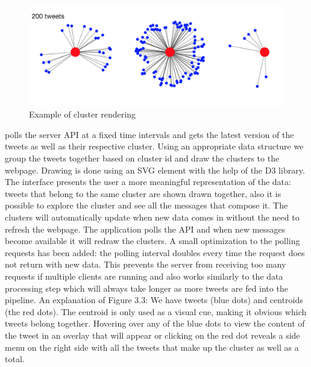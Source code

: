 \begin{figure}[ht!]
\centering
\includegraphics[width=\textwidth,height=\textheight,keepaspectratio]{src/img/clusters.png}
\caption{Example of cluster rendering\label{overflow}}
\end{figure}

{\frontend}  polls the server API at a fixed time intervals and gets the latest version of the tweets as well as their respective cluster. Using an appropriate data structure we group the tweets together based on cluster id and draw the clusters to the webpage. Drawing is done using an SVG element with the help of the D3 library.
\newline
The interface presents the user a more meaningful representation of the data: tweets that belong to the same cluster are shown drawn together, also it is possible to explore the cluster and see all the messages that compose it.
\newline
The clusters will automatically update when new data comes in without the need to refresh the webpage. The application polls the API and when new messages become available it will redraw the clusters. A small optimization to the polling requests has been added: the polling interval doubles every time the request does not return with new data. This prevents the server from receiving too many requests if multiple {\frontend}  clients are running and also works similarly to the data processing step which will always take longer as more tweets are fed into the pipeline.
\newline
An explanation of Figure 3.3: We have tweets (blue dots) and centroids (the red dots). The centroid is only used as a visual cue, making it obvious which tweets belong together. Hovering over any of the blue dots to view the content of the tweet in an overlay that will appear or clicking on the red dot reveals a side menu on the right side with all the tweets that make up the cluster as well as a total.
